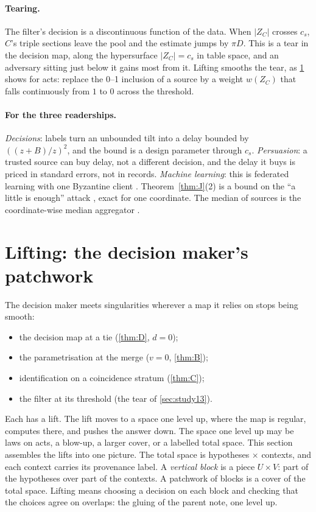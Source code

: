\documentclass[11pt]{article}
\theoremstyle{definition}\newtheorem{definition}{Definition}\newtheorem{remark}{Remark}
\begin{document}
\paragraph{Tearing.} The filter's decision is a discontinuous function of the data. When $|Z_C|$ crosses $c_s$, $C$'s triple sections
leave the pool and the estimate jumps by $\pi D$. This is a tear in the decision map, along the hypersurface $|Z_C|=c_s$ in table
space, and an adversary sitting just below it gains most from it. Lifting smooths the tear, as \cref{sec:lift} shows for acts: replace
the 0--1 inclusion of a source by a weight $w(Z_C)$ that falls continuously from $1$ to $0$ across the threshold.

\paragraph{For the three readerships.} \emph{Decisions}: labels turn an unbounded tilt into a delay bounded by $((z+B)/z)^2$, and the
bound is a design parameter through $c_s$. \emph{Persuasion}: a trusted source can buy delay, not a different decision, and the delay it
buys is priced in standard errors, not in records. \emph{Machine learning}: this is federated learning with one Byzantine client
\cite{BlanchardEtAl2017}. Theorem~\ref{thm:J}(2) is a
bound on the ``a little is enough'' attack \cite{BaruchEtAl2019}, exact for one coordinate. The median of sources is the
coordinate-wise median aggregator \cite{YinEtAl2018}.



\section{Lifting: the decision maker's patchwork}\label{sec:lift}
The decision maker meets singularities wherever a map it relies on stops being smooth:
\begin{itemize}
\item the decision map at a tie (\cref{thm:D}, $d=0$);
\item the parametrisation at the merge ($v=0$, \cref{thm:B});
\item identification on a coincidence stratum (\cref{thm:C});
\item the filter at its threshold (the tear of \cref{sec:study13}).
\end{itemize}
Each has a lift. The lift moves to a space one level up, where the map is regular, computes there, and pushes the answer down. The
space one level up may be laws on acts, a blow-up, a larger cover, or a labelled total space. This section assembles the lifts into one
picture. The total space is hypotheses $\times$ contexts, and each context carries its provenance label. A \emph{vertical block} is a
piece $U\times V$: part of the hypotheses over part of the contexts. A patchwork of blocks is a cover of the total space. Lifting means
choosing a decision on each block and checking that the choices agree on overlaps: the gluing of the parent note, one level up.
\end{document}
